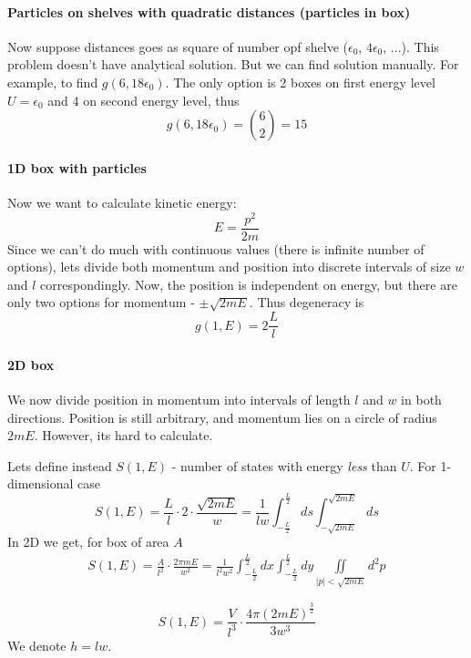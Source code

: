 \paragraph{Particles on shelves with quadratic distances (particles in box)}
Now suppose distances goes as square of number opf shelve ($\epsilon_0$, $4\epsilon_0$, ...). This problem doesn't have analytical solution. But we can find solution manually. For example, to find $g(6,18\epsilon_0)$. The only option is 2 boxes on first energy level $U=\epsilon_0$ and 4 on second energy level, thus 
$$g(6, 18\epsilon_0) = \binom{6}{2}=15$$  
\paragraph{1D box with particles}
Now we want to calculate kinetic energy:
$$E = \frac{p^2}{2m}$$
Since we can't do much with continuous values (there is infinite number of options), lets divide both momentum and position into discrete intervals of size $w$ and $l$ correspondingly. Now, the position is independent on energy, but there are only two options for momentum - $\pm \sqrt{2mE}$. Thus degeneracy is
$$g(1, E) = 2\frac{L}{l} $$
\paragraph{2D box}
We now divide position in momentum into intervals of length $l$ and $w$ in both directions. Position is still arbitrary, and momentum lies on a circle of radius $2mE$. However, its hard to calculate.

Lets define instead $S(1,E)$ - number of states with energy \textit{less} than $U$. For 1-dimensional case 
$$S(1,E)  = \frac{L}{l} \cdot 2 \cdot \frac{\sqrt{2mE}}{w} = \frac{1}{lw} \int_{-\frac{L}{2}}^{\frac{L}{2}} ds \int_{-\sqrt{2mE}}^{\sqrt{2mE}} ds$$
In 2D we get, for box of area $A$
\begin{align*}
S(1,E) = \frac{A}{l^2} \cdot \frac{2\pi m E}{w^2} =  \frac{1}{l^2w^2} \int_{-\frac{L}{2}}^{\frac{L}{2}}dx\int_{-\frac{L}{2}}^{\frac{L}{2}}dy \iint\limits_{|p| < \sqrt{2mE}} d^2p
\end{align*}

$$S(1,E) = \frac{V}{l^3} \cdot\frac{4\pi (2 m E)^{\frac{3}{2}}}{3w^3}$$
We denote $h=lw$.